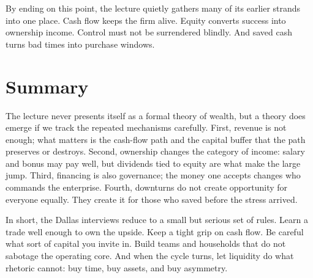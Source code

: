 By ending on this point, the lecture quietly gathers many of its earlier strands into one place. Cash flow keeps the firm alive. Equity converts success into ownership income. Control must not be surrendered blindly. And saved cash turns bad times into purchase windows.

\section{Summary}

The lecture never presents itself as a formal theory of wealth, but a theory does emerge if we track the repeated mechanisms carefully. First, revenue is not enough; what matters is the cash-flow path and the capital buffer that the path preserves or destroys. Second, ownership changes the category of income: salary and bonus may pay well, but dividends tied to equity are what make the large jump. Third, financing is also governance; the money one accepts changes who commands the enterprise. Fourth, downturns do not create opportunity for everyone equally. They create it for those who saved before the stress arrived.

In short, the Dallas interviews reduce to a small but serious set of rules. Learn a trade well enough to own the upside. Keep a tight grip on cash flow. Be careful what sort of capital you invite in. Build teams and households that do not sabotage the operating core. And when the cycle turns, let liquidity do what rhetoric cannot: buy time, buy assets, and buy asymmetry.